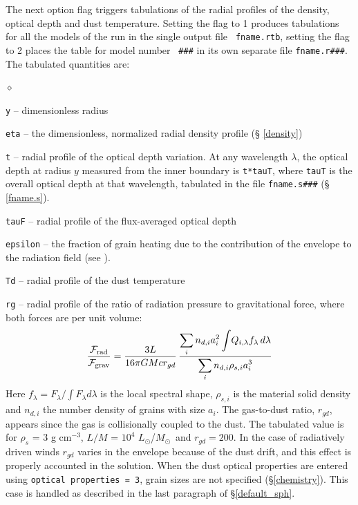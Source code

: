 \documentclass[11pt]{article}
\def\E#1{\hbox{$10^{#1}$}}
\def\eq#1{\begin{equation} #1 \end{equation}}
\def\Mo     {\hbox{$M_{\odot}$}}
\def\Lo     {\hbox{$L_{\odot}$}}
\def\DS     {\displaystyle}
\def\sub#1{_{\rm #1}}
\def\Frad {\hbox{${\cal F}\sub{rad}$}}
\def\Fgrav{\hbox{${\cal F}\sub{grav}$}}
\begin{document}
The next option flag triggers tabulations of the radial profiles of the
density, optical depth and dust temperature. Setting the flag to 1 produces
tabulations for all the models of the run in the single output file {\tt
fname.rtb}, setting the flag to 2 places the table for model number {\tt
\#\#\#} in its own separate file {\tt fname.r\#\#\#}. The tabulated quantities
are:

\begin{list}{$\diamond$}{}
\item{\tt y} -- dimensionless radius
\item{\tt eta} -- the dimensionless, normalized radial density profile (\S
    \ref{density})
\item {\tt t} -- radial profile of the optical depth variation.  At any
    wavelength $\lambda$, the optical depth at radius $y$ measured from the
    inner boundary is {\tt t*tauT}, where {\tt tauT} is the overall optical
    depth at that wavelength, tabulated in the file {\tt fname.s\#\#\#} (\S
    \ref{fname.s}).

\item{\tt tauF} -- radial profile of the flux-averaged optical depth
\item {\tt epsilon} -- the fraction of grain heating due to the contribution of
    the envelope to the radiation field (see \cite{IE97}).
\item{\tt Td} -- radial profile of the dust temperature
\item{\tt rg} -- radial profile of the ratio of radiation pressure to
    gravitational force, where both forces are per unit volume:
\eq{
    {\Frad\over\Fgrav} = {3L\over16\pi GMc r_{gd}}\,
    {\DS \sum_i n_{d,i} a_i^2\int\!Q_{i,\lambda} f_\lambda\,d\lambda \over
     \DS \sum_i n_{d,i}\rho_{s,i}a_i^3}
}
Here $f_\lambda = F_\lambda/\int F_\lambda d\lambda$ is the local spectral
shape, $\rho_{s,i}$ is the material solid density and $n_{d,i}$ the number
density of grains with size $a_i$.  The gas-to-dust ratio, $r_{gd}$, appears
since the gas is collisionally coupled to the dust. The tabulated value is for
$\rho_s$ = 3 g cm$^{-3}$, $L/M$ = \E4 \Lo/\Mo\ and $r_{gd} = 200$. In the case
of radiatively driven winds $r_{gd}$ varies in the envelope because of the dust
drift, and this effect is properly accounted in the solution. When the dust
optical properties are entered using {\tt optical properties = 3}, grain sizes
are not specified (\S \ref{chemistry}). This case is handled as described in
the last paragraph of \S\ref{default_sph}.

\end{list}
\end{document}
